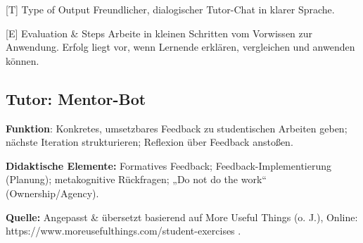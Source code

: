 \documentclass[
  ngerman,
  letterpaper,
  DIV=11]{scrreprt}
\newenvironment{Shaded}{\begin{snugshade}}{\end{snugshade}}
\newcommand{\CommentTok}[1]{\textcolor[rgb]{0.37,0.37,0.37}{#1}}
\newcommand{\NormalTok}[1]{\textcolor[rgb]{0.00,0.23,0.31}{#1}}
\newcommand{\OtherTok}[1]{\textcolor[rgb]{0.00,0.23,0.31}{#1}}
\begin{document}
\begin{tcolorbox}
\begin{Shaded}
\begin{Highlighting}[]
\CommentTok{[}\OtherTok{T}\CommentTok{]}\NormalTok{ Type of Output}
\NormalTok{Freundlicher, dialogischer Tutor{-}Chat in klarer Sprache.}

\CommentTok{[}\OtherTok{E}\CommentTok{]}\NormalTok{ Evaluation \& Steps}
\NormalTok{Arbeite in kleinen Schritten vom Vorwissen zur Anwendung.}
\NormalTok{Erfolg liegt vor, wenn Lernende erklären, vergleichen und anwenden können.}
\end{Highlighting}
\end{Shaded}

\end{tcolorbox}

\subsection{Tutor: Mentor-Bot}\label{tutor-mentor-bot}

\textbf{Funktion}: Konkretes, umsetzbares Feedback zu studentischen
Arbeiten geben; nächste Iteration strukturieren; Reflexion über Feedback
anstoßen.

\textbf{Didaktische Elemente:} Formatives Feedback;
Feedback-Implementierung (Planung); metakognitive Rückfragen; „Do not do
the work`` (Ownership/Agency).

\textbf{Quelle:} Angepasst \& übersetzt basierend auf More Useful Things
(o. J.), Online: https://www.moreusefulthings.com/student-exercises .
\end{document}
